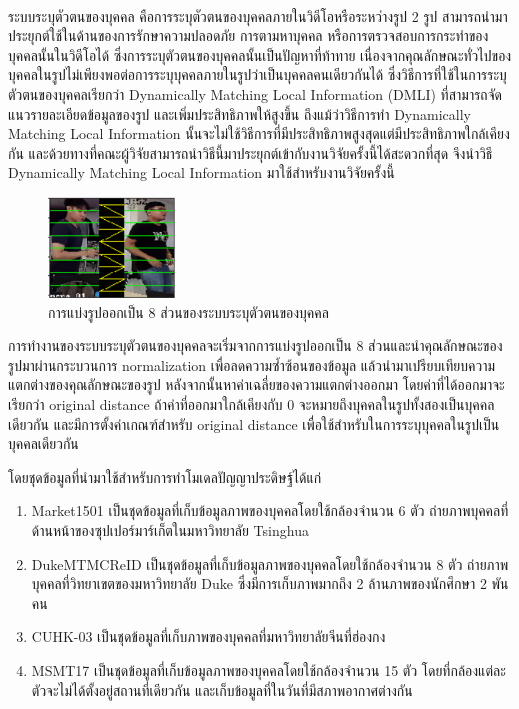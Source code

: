 ระบบระบุตัวตนของบุคคล\textsuperscript{\cite{luo2019alignedreid++}} คือการระบุตัวตนของบุคคลภายในวิดีโอหรือระหว่างรูป 2 รูป สามารถนำมาประยุกต์ใช้ในด้านของการรักษาความปลอดภัย 
การตามหาบุคคล หรือการตรวจสอบการกระทำของบุคคลนั้นในวิดีโอได้ ซึ่งการระบุตัวตนของบุคคลนั้นเป็นปัญหาที่ท้าทาย 
เนื่องจากคุณลักษณะทั่วไปของบุคคลในรูปไม่เพียงพอต่อการระบุบุคคลภายในรูปว่าเป็นบุคคลคนเดียวกันได้ 
ซึ่งวิธีการที่ใช้ในการระบุตัวตนของบุคคลเรียกว่า Dynamically Matching Local Information (DMLI) ที่สามารถจัดแนวรายละเอียดข้อมูลของรูป และเพิ่มประสิทธิภาพให้สูงขึ้น ถึงแม้ว่าวิธีการทำ Dynamically Matching Local Information นั้นจะไม่ใช้วิธีการที่มีประสิทธิภาพสูงสุดแต่มีประสิทธิภาพใกล้เคียงกัน และด้วยทางที่คณะผู้วิจัยสามารถนำวิธีนี้มาประยุกต์เข้ากับงานวิจัยครั้งนี้ได้สะดวกที่สุด จึงนำวิธี Dynamically Matching Local Information มาใช้สำหรับงานวิจัยครั้งนี้

\begin{figure}[!ht]
	\centering
	\includegraphics[width=0.3\textwidth]{chapter2/images/alignedreid.png}
		\caption{การแบ่งรูปออกเป็น 8 ส่วนของระบบระบุตัวตนของบุคคล}
    	\label{fig:alignedreid}
\end{figure}

การทำงานของระบบระบุตัวตนของบุคคลจะเริ่มจากการแบ่งรูปออกเป็น 8 ส่วนและนำคุณลักษณะของรูปมาผ่านกระบวนการ normalization เพื่อลดความซ้ำซ้อนของข้อมูล 
แล้วนำมาเปรียบเทียบความแตกต่างของคุณลักษณะของรูป หลังจากนั้นหาค่าเฉลี่ยของความแตกต่างออกมา โดยค่าที่ได้ออกมาจะเรียกว่า original distance ถ้าค่าที่ออกมาใกล้เคียงกับ 0 จะหมายถึงบุคคลในรูปทั้งสองเป็นบุคคลเดียวกัน  และมีการตั้งค่าเกณฑ์สำหรับ original distance เพื่อใช้สำหรับในการระบุบุคคลในรูปเป็นบุคคลเดียวกัน


โดยชุดข้อมูลที่นำมาใช้สำหรับการทำโมเดลปัญญาประดิษฐ์ได้แก่
\begin{enumerate}
	\item {Market1501 เป็นชุดข้อมูลที่เก็บข้อมูลภาพของบุคคลโดยใช้กล้องจำนวน 6 ตัว ถ่ายภาพบุคคลที่ด้านหน้าของซุปเปอร์มาร์เก็ตในมหาวิทยาลัย Tsinghua}
	\item{DukeMTMCReID เป็นชุดข้อมูลที่เก็บข้อมูลภาพของบุคคลโดยใช้กล้องจำนวน 8 ตัว ถ่ายภาพบุคคลที่วิทยาเขตของมหาวิทยาลัย Duke ซึ่งมีการเก็บภาพมากถึง 2 ล้านภาพของนักศึกษา 2 พันคน }
	\item{CUHK-03 เป็นชุดข้อมูลที่เก็บภาพของบุคคลที่มหาวิทยาลัยจีนที่ฮ่องกง}
	\item{MSMT17 เป็นชุดข้อมูลที่เก็บข้อมูลภาพของบุคคลโดยใช้กล้องจำนวน 15 ตัว โดยที่กล้องแต่ละตัวจะไม่ได้ตั้งอยู่สถานที่เดียวกัน และเก็บข้อมูลที่ในวันที่มีสภาพอากาศต่างกัน}
\end{enumerate}

